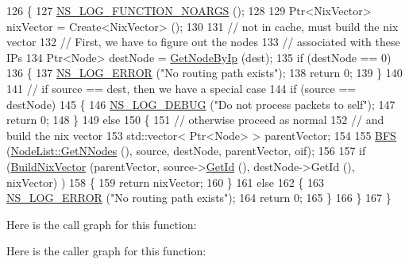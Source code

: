 \begin{DoxyCode}
126 \{
127   \hyperlink{log-macros-disabled_8h_a8f7e4afc291c9d29a65c18ac1f79197b}{NS\_LOG\_FUNCTION\_NOARGS} ();
128 
129   Ptr<NixVector> nixVector = Create<NixVector> ();
130 
131   \textcolor{comment}{// not in cache, must build the nix vector}
132   \textcolor{comment}{// First, we have to figure out the nodes }
133   \textcolor{comment}{// associated with these IPs}
134   Ptr<Node> destNode = \hyperlink{classns3_1_1Ipv4NixVectorRouting_a24d3474ebcb1fc7da5a133dc071cd2df}{GetNodeByIp} (dest);
135   \textcolor{keywordflow}{if} (destNode == 0)
136     \{
137       \hyperlink{group__logging_ga0261a8db1d4ac5f79417d117634fd455}{NS\_LOG\_ERROR} (\textcolor{stringliteral}{"No routing path exists"});
138       \textcolor{keywordflow}{return} 0;
139     \}
140 
141   \textcolor{comment}{// if source == dest, then we have a special case}
144 \textcolor{comment}{}  \textcolor{keywordflow}{if} (source == destNode)
145     \{
146       \hyperlink{group__logging_ga413f1886406d49f59a6a0a89b77b4d0a}{NS\_LOG\_DEBUG} (\textcolor{stringliteral}{"Do not process packets to self"});
147       \textcolor{keywordflow}{return} 0;
148     \}
149   \textcolor{keywordflow}{else}
150     \{
151       \textcolor{comment}{// otherwise proceed as normal }
152       \textcolor{comment}{// and build the nix vector}
153       std::vector< Ptr<Node> > parentVector;
154 
155       \hyperlink{classns3_1_1Ipv4NixVectorRouting_aba4436060833304f21000470702da6d9}{BFS} (\hyperlink{classns3_1_1NodeList_a1d110b1670005895dd5812baab13682a}{NodeList::GetNNodes} (), source, destNode, parentVector, oif);
156 
157       \textcolor{keywordflow}{if} (\hyperlink{classns3_1_1Ipv4NixVectorRouting_ac797bda1b70ad4c4aa7e8d5729a50455}{BuildNixVector} (parentVector, source->\hyperlink{classns3_1_1Node_aaf49b64a843565ce3812326313b370ac}{GetId} (), destNode->GetId (), nixVector)
      )
158         \{
159           \textcolor{keywordflow}{return} nixVector;
160         \}
161       \textcolor{keywordflow}{else}
162         \{
163           \hyperlink{group__logging_ga0261a8db1d4ac5f79417d117634fd455}{NS\_LOG\_ERROR} (\textcolor{stringliteral}{"No routing path exists"});
164           \textcolor{keywordflow}{return} 0;
165         \}
166     \}
167 \}
\end{DoxyCode}


Here is the call graph for this function\+:




Here is the caller graph for this function\+:


